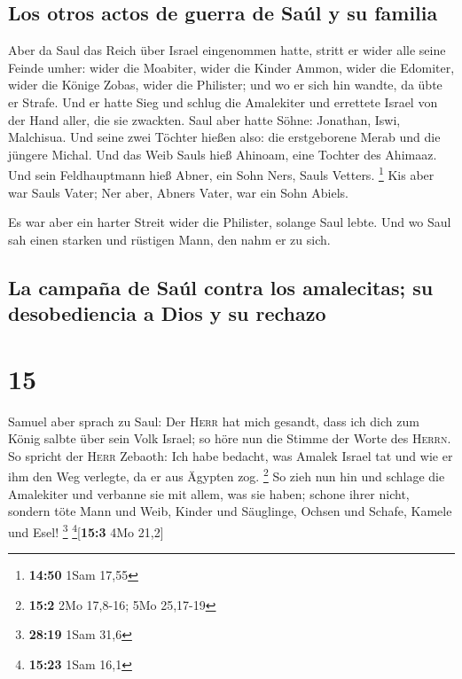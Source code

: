 \hypertarget{los-otros-actos-de-guerra-de-sauxfal-y-su-familia}{%
\subsection{Los otros actos de guerra de Saúl y su
familia}\label{los-otros-actos-de-guerra-de-sauxfal-y-su-familia}}

 Aber da Saul das Reich über Israel eingenommen hatte,
stritt er wider alle seine Feinde umher: wider die Moabiter, wider die
Kinder Ammon, wider die Edomiter, wider die Könige Zobas, wider die
Philister; und wo er sich hin wandte, da übte er Strafe. 
Und er hatte Sieg und schlug die Amalekiter und errettete Israel von der
Hand aller, die sie zwackten.  Saul aber hatte Söhne:
Jonathan, Iswi, Malchisua. Und seine zwei Töchter hießen also: die
erstgeborene Merab und die jüngere Michal.  Und das Weib
Sauls hieß Ahinoam, eine Tochter des Ahimaaz. Und sein Feldhauptmann
hieß Abner, ein Sohn Ners, Sauls Vetters. \footnote{\textbf{14:50} 1Sam
  17,55}  Kis aber war Sauls Vater; Ner aber, Abners
Vater, war ein Sohn Abiels.

 Es war aber ein harter Streit wider die Philister,
solange Saul lebte. Und wo Saul sah einen starken und rüstigen Mann, den
nahm er zu sich.

\hypertarget{la-campauxf1a-de-sauxfal-contra-los-amalecitas-su-desobediencia-a-dios-y-su-rechazo}{%
\subsection{La campaña de Saúl contra los amalecitas; su desobediencia a
Dios y su
rechazo}\label{la-campauxf1a-de-sauxfal-contra-los-amalecitas-su-desobediencia-a-dios-y-su-rechazo}}

\hypertarget{section-14}{%
\section{15}\label{section-14}}

 Samuel aber sprach zu Saul: Der \textsc{Herr} hat mich
gesandt, dass ich dich zum König salbte über sein Volk Israel; so höre
nun die Stimme der Worte des \textsc{Herrn}.  So spricht
der \textsc{Herr} Zebaoth: Ich habe bedacht, was Amalek Israel tat und
wie er ihm den Weg verlegte, da er aus Ägypten zog. \footnote{\textbf{15:2}
  2Mo 17,8-16; 5Mo 25,17-19}  So zieh nun hin und schlage
die Amalekiter und verbanne sie mit allem, was sie haben; schone ihrer
nicht, sondern töte Mann und Weib, Kinder und Säuglinge, Ochsen und
Schafe, Kamele und Esel! \footnote{\textbf{28:19} 1Sam 31,6}
\footnote{\textbf{15:23} 1Sam 16,1}{[}\textbf{15:3} 4Mo 21,2{]}

